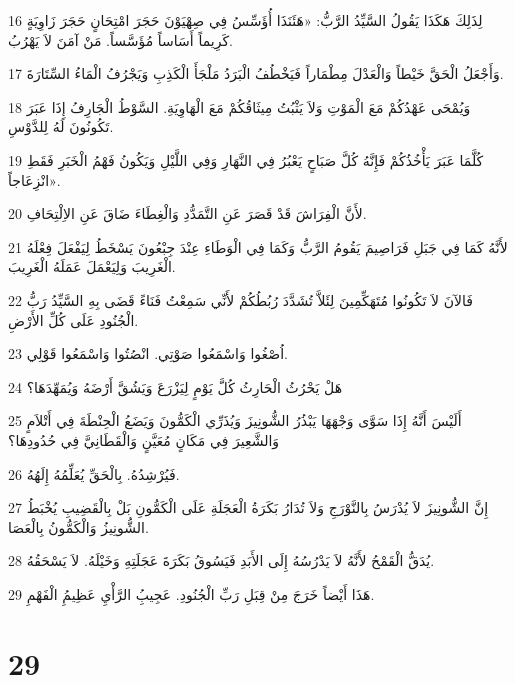 \par 16 لِذَلِكَ هَكَذَا يَقُولُ السَّيِّدُ الرَّبُّ: «هَئَنَذَا أُؤَسِّسُ فِي صِهْيَوْنَ حَجَرَ امْتِحَانٍ حَجَرَ زَاوِيَةٍ كَرِيماً أَسَاساً مُؤَسَّساً. مَنْ آمَنَ لاَ يَهْرُبُ.
\par 17 وَأَجْعَلُ الْحَقَّ خَيْطاً وَالْعَدْلَ مِطْمَاراً فَيَخْطُفُ الْبَرَدُ مَلْجَأَ الْكَذِبِ وَيَجْرُفُ الْمَاءُ السِّتَارَةَ.
\par 18 وَيُمْحَى عَهْدُكُمْ مَعَ الْمَوْتِ وَلاَ يَثْبُتُ مِيثَاقُكُمْ مَعَ الْهَاوِيَةِ. السَّوْطُ الْجَارِفُ إِذَا عَبَرَ تَكُونُونَ لَهُ لِلدَّوْسِ.
\par 19 كُلَّمَا عَبَرَ يَأْخُذُكُمْ فَإِنَّهُ كُلَّ صَبَاحٍ يَعْبُرُ فِي النَّهَارِ وَفِي اللَّيْلِ وَيَكُونُ فَهْمُ الْخَبَرِ فَقَطِ انْزِعَاجاً».
\par 20 لأَنَّ الْفِرَاشَ قَدْ قَصَرَ عَنِ التَّمَدُّدِ وَالْغِطَاءَ ضَاقَ عَنِ الاِلْتِحَافِ.
\par 21 لأَنَّهُ كَمَا فِي جَبَلِ فَرَاصِيمَ يَقُومُ الرَّبُّ وَكَمَا فِي الْوَطَاءِ عِنْدَ جِبْعُونَ يَسْخَطُ لِيَفْعَلَ فِعْلَهُ الْغَرِيبَ وَلِيَعْمَلَ عَمَلَهُ الْغَرِيبَ.
\par 22 فَالآنَ لاَ تَكُونُوا مُتَهَكِّمِينَ لِئَلاَّ تُشَدَّدَ رُبُطُكُمْ لأَنِّي سَمِعْتُ فَنَاءً قَضَى بِهِ السَّيِّدُ رَبُّ الْجُنُودِ عَلَى كُلِّ الأَرْضِ.
\par 23 اُصْغُوا وَاسْمَعُوا صَوْتِي. انْصُتُوا وَاسْمَعُوا قَوْلِي.
\par 24 هَلْ يَحْرُثُ الْحَارِثُ كُلَّ يَوْمٍ لِيَزْرَعَ وَيَشُقَّ أَرْضَهُ وَيُمَهِّدَهَا؟
\par 25 أَلَيْسَ أَنَّهُ إِذَا سَوَّى وَجْهَهَا يَبْذُرُ الشُّونِيزَ وَيُذَرِّي الْكَمُّونَ وَيَضَعُ الْحِنْطَةَ فِي أَتْلاَمٍ وَالشَّعِيرَ فِي مَكَانٍ مُعَيَّنٍ وَالْقَطَانِيَّ فِي حُدُودِهَا؟
\par 26 فَيُرْشِدُهُ. بِالْحَقِّ يُعَلِّمُهُ إِلَهُهُ.
\par 27 إِنَّ الشُّونِيزَ لاَ يُدْرَسُ بِالنَّوْرَجِ وَلاَ تُدَارُ بَكَرَةُ الْعَجَلَةِ عَلَى الْكَمُّونِ بَلْ بِالْقَضِيبِ يُخْبَطُ الشُّونِيزُ وَالْكَمُّونُ بِالْعَصَا.
\par 28 يُدَقُّ الْقَمْحُ لأَنَّهُ لاَ يَدْرُسُهُ إِلَى الأَبَدِ فَيَسُوقُ بَكَرَةَ عَجَلَتِهِ وَخَيْلَهُ. لاَ يَسْحَقُهُ.
\par 29 هَذَا أَيْضاً خَرَجَ مِنْ قِبَلِ رَبِّ الْجُنُودِ. عَجِيبُِ الرَّأْيِ عَظِيمُِ الْفَهْمِ.

\chapter{29}

